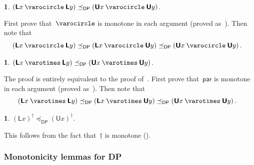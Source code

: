 \documentclass[twocolumn,english]{IEEEconf}
\theoremstyle{plain}
\theoremstyle{definition}
\theoremstyle{definition}
\theoremstyle{plain}
\newtheorem{lem}[thm]{\protect\lemmaname}
\newcommand{\aword}[1]{\mathsf{#1}}
\newcommand{\vmath}[1]{\aword{#1}}
\newcommand{\posleq}{\preceq}
\newcommand{\dppar}{\vmath{par}}
\newcommand{\udpL}{\boldsymbol{\mathsf{L}}}
\newcommand{\udpU}{\boldsymbol{\mathsf{U}}}
\newcommand{\dpsp}{\vmath{DP}}
\newcommand{\dpleq}{\posleq_\dpsp}
\newcommand{\oploop}{\dagger}
\newcommand{\opseries}{\mathbin{\varocircle}}
\newcommand{\oppar}{\mathbin{\varotimes}}
\providecommand{\lemmaname}{Lemma}
\begin{document}
\begin{lem}
\label{lem:well-formed-series}$\left(\udpL x\opseries\udpL y\right)\dpleq\left(\udpU x\opseries\udpU y\right)$. 
\end{lem}
\begin{IEEEproof}
First prove that~$\opseries$ is monotone in each argument (proved
as~). Then note that
\[
\left(\udpL x\opseries\udpL y\right)\dpleq\left(\udpL x\opseries\udpU y\right)\dpleq\left(\udpU x\opseries\udpU y\right).
\]
\end{IEEEproof}
\begin{lem}
\label{lem:well-formed-par}$\left(\udpL x\oppar\udpL y\right)\dpleq\left(\udpU x\oppar\udpU y\right)$.
\end{lem}
\begin{IEEEproof}
The proof is entirely equivalent to the proof of~.
First prove that~$\dppar$ is monotone in each argument (proved as~).
Then note that~
\[
\left(\udpL x\oppar\udpL y\right)\dpleq\left(\udpL x\oppar\udpU y\right)\dpleq\left(\udpU x\oppar\udpU y\right).
\]
\end{IEEEproof}

\begin{lem}
\label{lem:well-formed-loop}$\left(\udpL x\right)^{\oploop}\dpleq\left(\udpU x\right)^{\oploop}$.
\end{lem}
\begin{IEEEproof}
This follows from the fact that~$\oploop$ is monotone ().
\end{IEEEproof}


\subsubsection{Monotonicity lemmas for DP}
\end{document}
